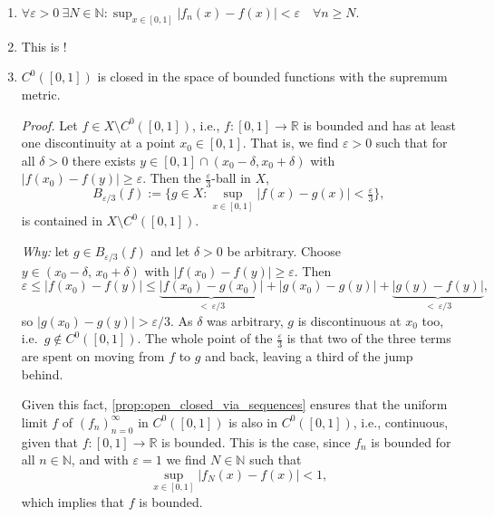 \begin{exercisesolution}
\begin{enumerate}[label=\textbf{(\alph*)}]
  \item $\displaystyle \forall \varepsilon > 0 \ \exists N \in \mathbb{N} : \sup_{x \in [0,1]} |f_n(x) - f(x)| < \varepsilon \quad \forall n \geq N$.
  \item This is  !
  \item $C^0([0,1])$ is closed in the space of bounded functions with the supremum metric.

    \textit{Proof.} Let $f \in X \setminus C^0([0,1])$, i.e., $f : [0,1] \to \mathbb{R}$ is
    bounded and has at least one discontinuity at a point $x_0 \in [0,1]$. That is, we find
    $\varepsilon > 0$ such that for all $\delta > 0$ there exists
    $y \in [0,1] \cap (x_0 - \delta, x_0 + \delta)$ with $|f(x_0) - f(y)| \geq \varepsilon$. Then the $\tfrac{\varepsilon}{3}$-ball in
    $X$,
    \[
    B_{\varepsilon/3}(f) := \Big\{ g \in X : \sup_{x \in [0,1]} |f(x) - g(x)| < \tfrac{\varepsilon}{3} \Big\},
    \]
    is contained in $X \setminus C^0([0,1])$.

    \textit{Why:} let $g \in B_{\varepsilon/3}(f)$ and let $\delta > 0$ be arbitrary. Choose
    $y \in (x_0-\delta,\,x_0+\delta)$ with $|f(x_0)-f(y)| \geq \varepsilon$. Then
    \[\varepsilon \leq |f(x_0)-f(y)|
      \leq \underbrace{|f(x_0)-g(x_0)|}_{<\ \varepsilon/3}
         + |g(x_0)-g(y)|
         + \underbrace{|g(y)-f(y)|}_{<\ \varepsilon/3},\]
    so $|g(x_0)-g(y)| > \varepsilon/3$. As $\delta$ was arbitrary, $g$ is discontinuous at
    $x_0$ too, i.e.\ $g \notin C^0([0,1])$. The whole point of the $\tfrac{\varepsilon}{3}$ is
    that two of the three terms are spent on moving from $f$ to $g$ and back, leaving a third
    of the jump behind.

    Given this fact, \cref{prop:open_closed_via_sequences} ensures that the uniform limit $f$ of
    $(f_n)_{n=0}^{\infty}$ in $C^0([0,1])$ is also in $C^0([0,1])$, i.e., continuous, given that
    $f : [0,1] \to \mathbb{R}$ is bounded. This is the case, since $f_n$ is bounded for all
    $n \in \mathbb{N}$, and with $\varepsilon = 1$ we find $N \in \mathbb{N}$ such that
    \[
    \sup_{x \in [0,1]} |f_N(x) - f(x)| < 1,
    \]
    which implies that $f$ is bounded.
\end{enumerate}
\end{exercisesolution}

